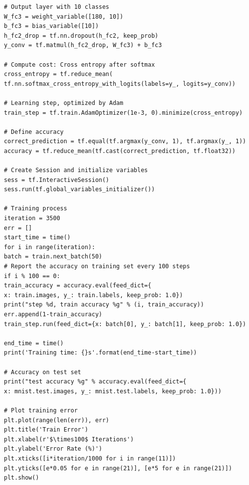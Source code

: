 \documentclass{article}
\begin{document}
\begin{lstlisting}
# Output layer with 10 classes
W_fc3 = weight_variable([180, 10])
b_fc3 = bias_variable([10])
h_fc2_drop = tf.nn.dropout(h_fc2, keep_prob)
y_conv = tf.matmul(h_fc2_drop, W_fc3) + b_fc3

# Compute cost: Cross entropy after softmax
cross_entropy = tf.reduce_mean(
tf.nn.softmax_cross_entropy_with_logits(labels=y_, logits=y_conv))

# Learning step, optimized by Adam
train_step = tf.train.AdamOptimizer(1e-3, 0).minimize(cross_entropy)

# Define accuracy
correct_prediction = tf.equal(tf.argmax(y_conv, 1), tf.argmax(y_, 1))
accuracy = tf.reduce_mean(tf.cast(correct_prediction, tf.float32))

# Create Session and initialize variables
sess = tf.InteractiveSession()
sess.run(tf.global_variables_initializer())

# Training process
iteration = 3500
err = []
start_time = time()
for i in range(iteration):
batch = train.next_batch(50)
# Report the accuracy on training set every 100 steps
if i % 100 == 0:
train_accuracy = accuracy.eval(feed_dict={
x: train.images, y_: train.labels, keep_prob: 1.0})
print("step %d, train accuracy %g" % (i, train_accuracy))
err.append(1-train_accuracy)
train_step.run(feed_dict={x: batch[0], y_: batch[1], keep_prob: 1.0})

end_time = time()
print('Training time: {}s'.format(end_time-start_time))

# Accuracy on test set
print("test accuracy %g" % accuracy.eval(feed_dict={
x: mnist.test.images, y_: mnist.test.labels, keep_prob: 1.0}))

# Plot training error
plt.plot(range(len(err)), err)
plt.title('Train Error')
plt.xlabel(r'$\times100$ Iterations')
plt.ylabel('Error Rate (%)')
plt.xticks([i*iteration/1000 for i in range(11)])
plt.yticks([e*0.05 for e in range(21)], [e*5 for e in range(21)])
plt.show()

\end{lstlisting}
\end{document}
